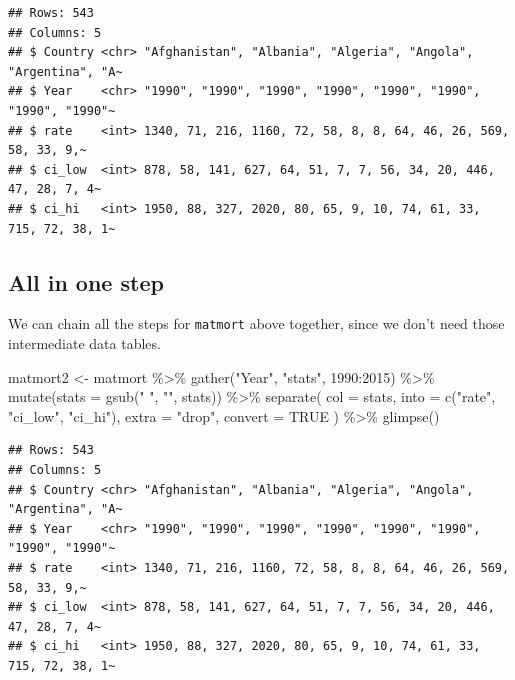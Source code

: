 \documentclass[
  oneside]{book}
\newenvironment{Shaded}{\begin{snugshade}}{\end{snugshade}}
\newcommand{\AttributeTok}[1]{\textcolor[rgb]{0.77,0.63,0.00}{#1}}
\newcommand{\ConstantTok}[1]{\textcolor[rgb]{0.00,0.00,0.00}{#1}}
\newcommand{\FunctionTok}[1]{\textcolor[rgb]{0.00,0.00,0.00}{#1}}
\newcommand{\NormalTok}[1]{#1}
\newcommand{\OtherTok}[1]{\textcolor[rgb]{0.56,0.35,0.01}{#1}}
\newcommand{\SpecialCharTok}[1]{\textcolor[rgb]{0.00,0.00,0.00}{#1}}
\newcommand{\StringTok}[1]{\textcolor[rgb]{0.31,0.60,0.02}{#1}}
\begin{document}
\begin{verbatim}
## Rows: 543
## Columns: 5
## $ Country <chr> "Afghanistan", "Albania", "Algeria", "Angola", "Argentina", "A~
## $ Year    <chr> "1990", "1990", "1990", "1990", "1990", "1990", "1990", "1990"~
## $ rate    <int> 1340, 71, 216, 1160, 72, 58, 8, 8, 64, 46, 26, 569, 58, 33, 9,~
## $ ci_low  <int> 878, 58, 141, 627, 64, 51, 7, 7, 56, 34, 20, 446, 47, 28, 7, 4~
## $ ci_hi   <int> 1950, 88, 327, 2020, 80, 65, 9, 10, 74, 61, 33, 715, 72, 38, 1~
\end{verbatim}

\hypertarget{all-in-one-step}{%
\subsection{All in one step}\label{all-in-one-step}}

We can chain all the steps for \texttt{matmort} above together, since we don't need those intermediate data tables.

\begin{Shaded}
\begin{Highlighting}[]
\NormalTok{matmort2 }\OtherTok{\textless{}{-}}\NormalTok{ matmort }\SpecialCharTok{\%\textgreater{}\%}
  \FunctionTok{gather}\NormalTok{(}\StringTok{"Year"}\NormalTok{, }\StringTok{"stats"}\NormalTok{, }\StringTok{\textasciigrave{}}\AttributeTok{1990}\StringTok{\textasciigrave{}}\SpecialCharTok{:}\StringTok{\textasciigrave{}}\AttributeTok{2015}\StringTok{\textasciigrave{}}\NormalTok{) }\SpecialCharTok{\%\textgreater{}\%}
  \FunctionTok{mutate}\NormalTok{(}\AttributeTok{stats =} \FunctionTok{gsub}\NormalTok{(}\StringTok{" "}\NormalTok{, }\StringTok{""}\NormalTok{, stats)) }\SpecialCharTok{\%\textgreater{}\%}
  \FunctionTok{separate}\NormalTok{(}
    \AttributeTok{col =}\NormalTok{ stats, }
    \AttributeTok{into =} \FunctionTok{c}\NormalTok{(}\StringTok{"rate"}\NormalTok{, }\StringTok{"ci\_low"}\NormalTok{, }\StringTok{"ci\_hi"}\NormalTok{), }
    \AttributeTok{extra =} \StringTok{"drop"}\NormalTok{, }
    \AttributeTok{convert =} \ConstantTok{TRUE}
\NormalTok{  ) }\SpecialCharTok{\%\textgreater{}\%}
  \FunctionTok{glimpse}\NormalTok{()}
\end{Highlighting}
\end{Shaded}

\begin{verbatim}
## Rows: 543
## Columns: 5
## $ Country <chr> "Afghanistan", "Albania", "Algeria", "Angola", "Argentina", "A~
## $ Year    <chr> "1990", "1990", "1990", "1990", "1990", "1990", "1990", "1990"~
## $ rate    <int> 1340, 71, 216, 1160, 72, 58, 8, 8, 64, 46, 26, 569, 58, 33, 9,~
## $ ci_low  <int> 878, 58, 141, 627, 64, 51, 7, 7, 56, 34, 20, 446, 47, 28, 7, 4~
## $ ci_hi   <int> 1950, 88, 327, 2020, 80, 65, 9, 10, 74, 61, 33, 715, 72, 38, 1~
\end{verbatim}
\end{document}
